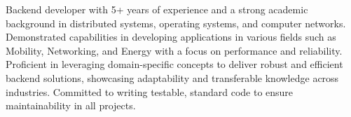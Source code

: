 \par{
    Backend developer with 5+ years of experience and a strong academic background in
    distributed systems, operating systems, and computer networks. Demonstrated capabilities
    in developing applications in various fields such as Mobility, Networking, and Energy with
    a focus on performance and reliability. Proficient in leveraging domain-specific concepts
    to deliver robust and efficient backend solutions, showcasing adaptability and transferable
    knowledge across industries. Committed to writing testable, standard code to ensure
    maintainability in all projects.
}